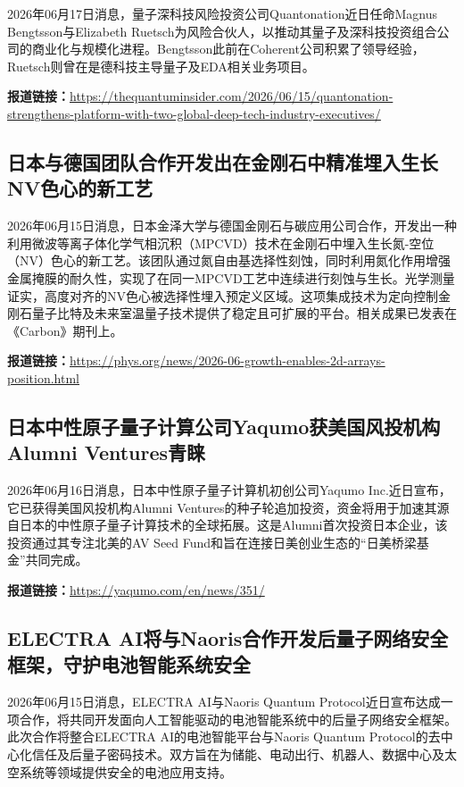 \documentclass[12pt,a4paper]{ctexart}
\begin{document}
2026年06月17日消息，量子深科技风险投资公司Quantonation近日任命Magnus Bengtsson与Elizabeth Ruetsch为风险合伙人，以推动其量子及深科技投资组合公司的商业化与规模化进程。Bengtsson此前在Coherent公司积累了领导经验，Ruetsch则曾在是德科技主导量子及EDA相关业务项目。

\noindent\textbf{报道链接：}\url{https://thequantuminsider.com/2026/06/15/quantonation-strengthens-platform-with-two-global-deep-tech-industry-executives/}

\subsection{ 日本与德国团队合作开发出在金刚石中精准埋入生长NV色心的新工艺 }

2026年06月15日消息，日本金泽大学与德国金刚石与碳应用公司合作，开发出一种利用微波等离子体化学气相沉积（MPCVD）技术在金刚石中埋入生长氮-空位（NV）色心的新工艺。该团队通过氮自由基选择性刻蚀，同时利用氮化作用增强金属掩膜的耐久性，实现了在同一MPCVD工艺中连续进行刻蚀与生长。光学测量证实，高度对齐的NV色心被选择性埋入预定义区域。这项集成技术为定向控制金刚石量子比特及未来室温量子技术提供了稳定且可扩展的平台。相关成果已发表在《Carbon》期刊上。

\noindent\textbf{报道链接：}\url{https://phys.org/news/2026-06-growth-enables-2d-arrays-position.html}

\subsection{ 日本中性原子量子计算公司Yaqumo获美国风投机构Alumni Ventures青睐 }

2026年06月16日消息，日本中性原子量子计算机初创公司Yaqumo Inc.近日宣布，它已获得美国风投机构Alumni Ventures的种子轮追加投资，资金将用于加速其源自日本的中性原子量子计算技术的全球拓展。这是Alumni首次投资日本企业，该投资通过其专注北美的AV Seed Fund和旨在连接日美创业生态的“日美桥梁基金”共同完成。

\noindent\textbf{报道链接：}\url{https://yaqumo.com/en/news/351/}

\subsection{ ELECTRA AI将与Naoris合作开发后量子网络安全框架，守护电池智能系统安全 }

2026年06月15日消息，ELECTRA AI与Naoris Quantum Protocol近日宣布达成一项合作，将共同开发面向人工智能驱动的电池智能系统中的后量子网络安全框架。此次合作将整合ELECTRA AI的电池智能平台与Naoris Quantum Protocol的去中心化信任及后量子密码技术。双方旨在为储能、电动出行、机器人、数据中心及太空系统等领域提供安全的电池应用支持。
\end{document}
